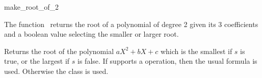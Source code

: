 \begin{ccRefFunction}{make_root_of_2}

\ccDefinition

The function \ccRefName\ returns the root of a polynomial of degree 2
given its 3 coefficients and a boolean value selecting the smaller
or larger root.


{ Returns the root of the polynomial $aX^2+bX+c$ which is the smallest if
$s$ is true, or the largest if $s$ is false.   If  supports a
 operation, then the usual formula is used.  Otherwise
the  class is used.
}

\ccSeeAlso
{}\\

\end{ccRefFunction}
